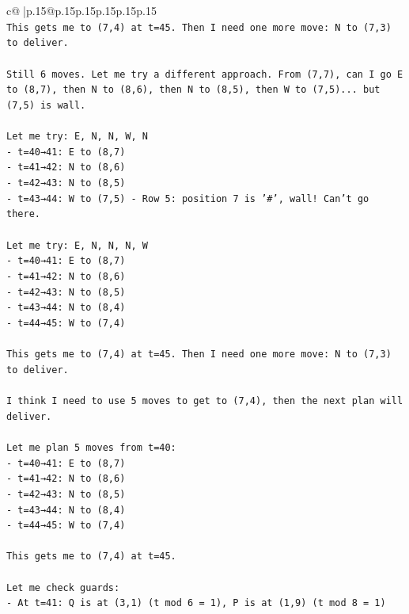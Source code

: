 \documentclass{article}
\begin{document}
{\begin{supertabular}{c@{$\;$}|p{.15\linewidth}@{}p{.15\linewidth}p{.15\linewidth}p{.15\linewidth}p{.15\linewidth}p{.15\linewidth}}
{{{\\ 
\texttt{This gets me to (7,4) at t=45. Then I need one more move: N to (7,3) to deliver.} \\
\\ 
\texttt{Still 6 moves. Let me try a different approach. From (7,7), can I go E to (8,7), then N to (8,6), then N to (8,5), then W to (7,5)... but (7,5) is wall.} \\
\\ 
\texttt{Let me try: E, N, N, W, N} \\
\texttt{{-} t=40→41: E to (8,7)} \\
\texttt{{-} t=41→42: N to (8,6)} \\
\texttt{{-} t=42→43: N to (8,5)} \\
\texttt{{-} t=43→44: W to (7,5) {-} Row 5: position 7 is '\#', wall! Can't go there.} \\
\\ 
\texttt{Let me try: E, N, N, N, W} \\
\texttt{{-} t=40→41: E to (8,7)} \\
\texttt{{-} t=41→42: N to (8,6)} \\
\texttt{{-} t=42→43: N to (8,5)} \\
\texttt{{-} t=43→44: N to (8,4)} \\
\texttt{{-} t=44→45: W to (7,4)} \\
\\ 
\texttt{This gets me to (7,4) at t=45. Then I need one more move: N to (7,3) to deliver.} \\
\\ 
\texttt{I think I need to use 5 moves to get to (7,4), then the next plan will deliver.} \\
\\ 
\texttt{Let me plan 5 moves from t=40:} \\
\texttt{{-} t=40→41: E to (8,7)} \\
\texttt{{-} t=41→42: N to (8,6)} \\
\texttt{{-} t=42→43: N to (8,5)} \\
\texttt{{-} t=43→44: N to (8,4)} \\
\texttt{{-} t=44→45: W to (7,4)} \\
\\ 
\texttt{This gets me to (7,4) at t=45.} \\
\\ 
\texttt{Let me check guards:} \\
\texttt{{-} At t=41: Q is at (3,1) (t mod 6 = 1), P is at (1,9) (t mod 8 = 1)} \\
}}}
\end{supertabular}}
\end{document}

